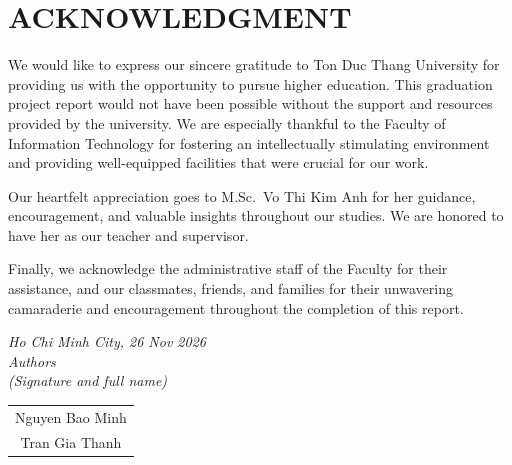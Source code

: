 \clearpage
\pagestyle{empty}
\chapter*{ACKNOWLEDGMENT}
\thispagestyle{empty}
\hspace*{\parindent}We would like to express our sincere gratitude to Ton Duc Thang University for providing us with the opportunity to pursue higher education. This graduation project report would not have been possible without the support and resources provided by the university. We are especially thankful to the Faculty of Information Technology for fostering an intellectually stimulating environment and providing well-equipped facilities that were crucial for our work.

Our heartfelt appreciation goes to M.Sc.\ Vo Thi Kim Anh for her guidance, encouragement, and valuable insights throughout our studies. We are honored to have her as our teacher and supervisor.

Finally, we acknowledge the administrative staff of the Faculty for their assistance, and our classmates, friends, and families for their unwavering camaraderie and encouragement throughout the completion of this report.

\vspace*{1cm}
\begin{flushright}
	\begin{minipage}{8.75cm}
		\centering
		\textit{Ho Chi Minh City, 26 Nov 2026}\\
		\textit{Authors}\\
		\textit{(Signature and full name)}\\[1.6cm]

		\begin{tabular}{c}
			Nguyen Bao Minh \\[1.6cm]
			Tran Gia Thanh \\
		\end{tabular}
	\end{minipage}
\end{flushright}
\clearpage
\pagestyle{fancy}
